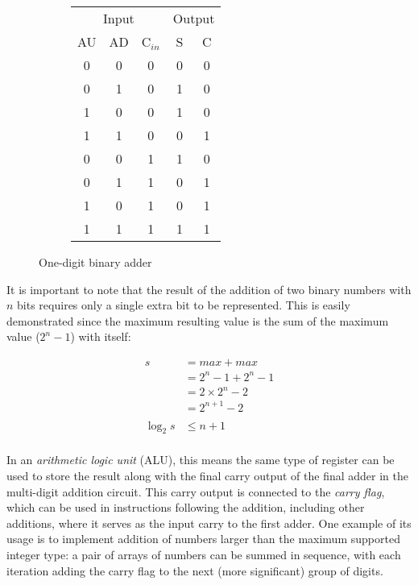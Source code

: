 \begin{figure}[ht]
    \centering
    \hfill
    \begin{subfigure}[h]{0.35\textwidth}
        \begin{tabular}{ccc|cc}
            \multicolumn{3}{c|}{Input} &
            \multicolumn{2}{c}{Output} \\
            AU & AD & C$_{in}$ & S & C \\
            \hline
            0 & 0 & 0 & 0 & 0 \\
            0 & 1 & 0 & 1 & 0 \\
            1 & 0 & 0 & 1 & 0 \\
            1 & 1 & 0 & 0 & 1 \\
            \hline
            0 & 0 & 1 & 1 & 0 \\
            0 & 1 & 1 & 0 & 1 \\
            1 & 0 & 1 & 0 & 1 \\
            1 & 1 & 1 & 1 & 1 \\
        \end{tabular}
    \end{subfigure}
    \hfill
    \begin{subfigure}[h]{0.5\textwidth}
        
    \end{subfigure}
    \caption{One-digit binary adder}
    \label{fig:arch:adder}
\end{figure}

It is important to note that the result of the addition of two binary numbers
with $n$ bits requires only a single extra bit to be represented.  This is
easily demonstrated since the maximum resulting value is the sum of the maximum
value ($2^n - 1$) with itself:

\begin{align*}
    s        &=   max + max \\
             &=   2^n - 1 + 2^n - 1 \\
             &=   2 \times 2^n - 2 \\
             &=   2^{n + 1} - 2 \\\\
    \log_2 s &\le n + 1 \\
\end{align*}

In an \textit{arithmetic logic unit} (ALU), this means the same type of register
can be used to store the result along with the final carry output of the final
adder in the multi-digit addition circuit.  This carry output is connected to
the \textit{carry flag}, which can be used in instructions following the
addition, including other additions, where it serves as the input carry to the
first adder.  One example of its usage is to implement addition of numbers
larger than the maximum supported integer type: a pair of arrays of numbers can
be summed in sequence, with each iteration adding the carry flag to the next
(more significant) group of digits.

